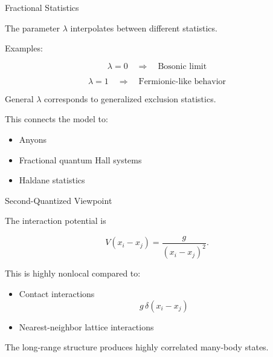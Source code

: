 \documentclass{beamer}
\begin{document}
\begin{frame}{Fractional Statistics}

The parameter $\lambda$ interpolates between different statistics.

\vspace{0.4cm}

Examples:

\[
\lambda = 0
\quad \Rightarrow \quad
\text{Bosonic limit}
\]

\vspace{0.3cm}

\[
\lambda = 1
\quad \Rightarrow \quad
\text{Fermionic-like behavior}
\]

\vspace{0.3cm}

General $\lambda$ corresponds to generalized exclusion statistics.

\vspace{0.3cm}

This connects the model to:
\begin{itemize}
    \item Anyons
    \item Fractional quantum Hall systems
    \item Haldane statistics
\end{itemize}

\end{frame}

\begin{frame}{Second-Quantized Viewpoint}

The interaction potential is

\[
V(x_i-x_j)
=
\frac{g}{(x_i-x_j)^2}.
\]

\vspace{0.3cm}

This is highly nonlocal compared to:

\begin{itemize}
    \item Contact interactions
    \[
    g\,\delta(x_i-x_j)
    \]
    
    \item Nearest-neighbor lattice interactions
\end{itemize}

\vspace{0.3cm}

The long-range structure produces highly correlated many-body states.

\end{frame}
\end{document}
